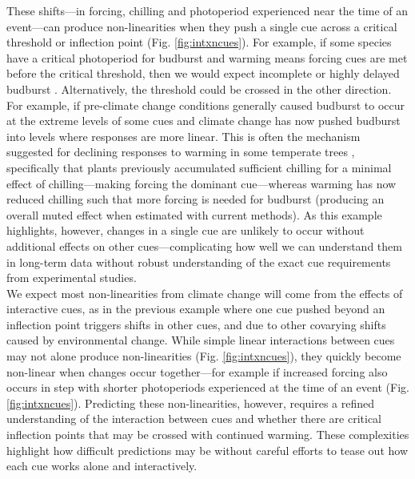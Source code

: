 \documentclass[11pt,letter]{article}
\begin{document}
These shifts---in forcing, chilling and photoperiod experienced near the time of an event---can produce non-linearities when they push a single cue across a critical threshold or inflection point (Fig. \ref{fig:intxncues}). For example, if some species have a critical photoperiod for budburst and warming means forcing cues are met before the critical threshold, then we would expect incomplete or highly delayed budburst \citep{Singh:2017,rinne2018}. Alternatively, the threshold could be crossed in the other direction. For example, if pre-climate change conditions generally caused budburst to occur at the extreme levels of some cues and climate change has now pushed budburst into levels where responses are more linear. This is often the mechanism suggested for declining responses to warming in some temperate trees \citep{fu2015,piao2017,gauzere2019}, specifically that plants previously accumulated sufficient chilling for a minimal effect of chilling---making forcing the dominant cue---whereas warming has now reduced chilling such that more forcing is needed for budburst (producing an overall muted effect when estimated with current methods). As this example highlights, however, changes in a single cue are unlikely to occur without additional effects on other cues---complicating how well we can understand them in long-term data without robust understanding of the exact cue requirements from experimental studies.\\

We expect most non-linearities from climate change will come from the effects of interactive cues, as in the previous example where one cue pushed beyond an inflection point triggers shifts in other cues, and due to other covarying shifts caused by environmental change. While simple linear interactions between cues may not alone produce non-linearities (Fig. \ref{fig:intxncues}), they quickly become non-linear when changes occur together---for example if increased forcing also occurs in step with shorter photoperiods experienced at the time of an event (Fig. \ref{fig:intxncues}). Predicting these non-linearities, however, requires a refined understanding of the interaction between cues and whether there are critical inflection points that may be crossed with continued warming. These complexities highlight how difficult predictions may be without careful efforts to tease out how each cue works alone and interactively. \\ 
\end{document}
